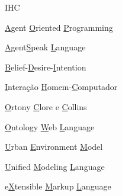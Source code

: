 \begin{listofabbrv}{IHC}
		\item[AOP] \underline{A}gent \underline{O}riented \underline{P}rogramming
		\item[ASL] \underline{A}gent\underline{S}peak \underline{L}anguage
		\item[BDI] \underline{B}elief-\underline{D}esire-\underline{I}ntention
        \item[IHC] \underline{I}ntera\c{c}\~{a}o \underline{H}omem-\underline{C}omputador
        \item[OCC] \underline{O}rtony \underline{C}lore e \underline{C}ollins
		\item[OWL] \underline{O}ntology \underline{W}eb \underline{L}anguage
		\item[UEM] \underline{U}rban \underline{E}nvironment \underline{M}odel
        \item[UML] \underline{U}nified \underline{M}odeling \underline{L}anguage
        \item[XML] e\underline{X}tensible \underline{M}arkup \underline{L}anguage

\end{listofabbrv}

